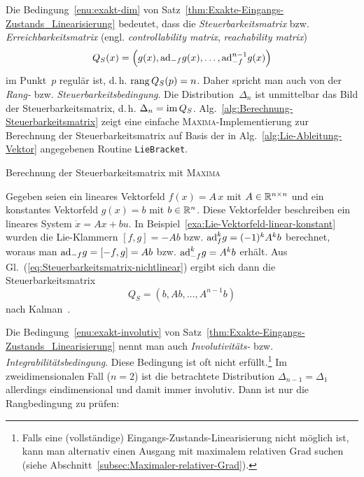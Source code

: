 \begin{remark}
\label{rem:Steuerbarkeitsmatrix}Die Bedingung~\ref{enu:exakt-dim}
von Satz~\ref{thm:Exakte-Eingangs-Zustands_Linearisierung} bedeutet,
dass die \emph{Steuerbarkeitsmatrix}
bzw. \emph{Erreichbarkeitsmatrix}
(engl. \emph{controllability matrix}, \emph{reachability matrix})
\begin{equation}
Q_{S}(x)=\left(g(x),{\operatorname{ad}}_{-f}g(x),\ldots,{\operatorname{ad}}_{-f}^{n-1}g(x)\right)\label{eq:Steuerbarkeitsmatrix-nichtlinear}
\end{equation}
im Punkt~$p$ regulär ist, d.\,h. ${\operatorname{rang}}\,Q_{S}(p)=n$. Daher spricht
man auch von der \emph{Rang-} bzw. \emph{Steuerbarkeitsbedingung}.
Die Distribution~$\Delta_{n}$ ist unmittelbar das Bild der Steuerbarkeitsmatrix,
d.\,h. $\Delta_{n}={\operatorname{im}}\,Q_{S}$. Alg.~\ref{alg:Berechnung-Steuerbarkeitsmatrix}
zeigt eine einfache \textsc{Maxima}-Implementierung zur Berechnung
der Steuerbarkeitsmatrix auf Basis der in Alg.~\ref{alg:Lie-Ableitung-Vektor}
angegebenen Routine \texttt{LieBracket}.
\end{remark}
\begin{algorithm}


\caption{Berechnung der Steuerbarkeitsmatrix mit \textsc{Maxima}\label{alg:Berechnung-Steuerbarkeitsmatrix}}
\end{algorithm}

\begin{example}
\label{exa:Steuerbarkeitsmatrix-linear-konstant}Gegeben seien ein
lineares Vektorfeld $f(x)=A\,x$ mit $A\in{\mathbb{R}}^{n\times n}$ und ein
konstantes Vektorfeld $g(x)=b$ mit $b\in{\mathbb{R}}^{n}$. Diese Vektorfelder
beschreiben ein lineares System $\dot{x}=Ax+bu$. In Beispiel~\ref{exa:Lie-Vektorfeld-linear-konstant}
wurden die Lie-Klammern $[f,g]=-Ab$ bzw. ${\operatorname{ad}}_{f}^{k}g=(-1)^{k}A^{k}b$
berechnet, woraus man ${\operatorname{ad}}_{-f}g=[-f,g]=Ab$ bzw. ${\operatorname{ad}}_{-f}^{k}g=A^{k}b$
erhält. Aus Gl.~(\ref{eq:Steuerbarkeitsmatrix-nichtlinear}) ergibt
sich dann die Steuerbarkeitsmatrix
\[
Q_{S}=\left(b,Ab,\ldots,A^{n-1}b\right)
\]
nach Kalman~\cite{lunze-rt2}.
\end{example}

Die Bedingung~\ref{enu:exakt-involutiv} von Satz~\ref{thm:Exakte-Eingangs-Zustands_Linearisierung}
nennt man auch \emph{Involutivitäts-} bzw. \emph{Integrabilitätsbedingung}.
Diese Bedingung ist oft nicht erfüllt.\footnote{Falls eine (vollständige) Eingangs-Zustands-Linearisierung nicht möglich
ist, kann man alternativ einen Ausgang mit maximalem relativen Grad
suchen (siehe Abschnitt~\ref{subsec:Maximaler-relativer-Grad}).} Im zweidimensionalen Fall ($n=2$) ist die betrachtete Distribution
$\Delta_{n-1}=\Delta_{1}$ allerdings eindimensional und damit immer
involutiv. Dann ist nur die Rangbedingung zu prüfen:

